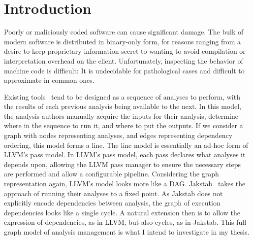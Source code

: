 \chapter{Introduction}
%
%
Poorly or maliciously coded software can cause significant damage.
The bulk of modern software is distributed in binary-only form, for reasons ranging from a desire to keep proprietary information secret to wanting to avoid compilation or interpretation overhead on the client.
Unfortunately, inspecting the behavior of machine code is difficult:
It is undecidable for pathological cases and difficult to approximate in common ones.

Existing tools~\cite{ida, bap, bitblaze, bindead} tend to be designed as a sequence of analyses to perform, with the results of each previous analysis being available to the next.
In this model, the analysis authors manually acquire the inputs for their analysis, determine where in the sequence to run it, and where to put the outputs.
If we consider a graph with nodes representing analyses, and edges representing dependency ordering, this model forms a line.
The line model is essentially an ad-hoc form of LLVM\cite{llvm}'s pass model.
In LLVM's pass model, each pass declares what analyses it depends upon, allowing the LLVM pass manager to ensure the necessary steps are performed and allow a configurable pipeline.
Considering the graph representation again, LLVM's model looks more like a DAG.
Jakstab~\cite{jakstab} takes the approach of running their analyses to a fixed point.
As Jakstab does not explicitly encode dependencies between analysis, the graph of execution dependencies looks like a single cycle.
A natural extension then is to allow the expression of dependencies, as in LLVM, but also cycles, as in Jakstab.
This full graph model of analysis management is what I intend to investigate in my thesis.


